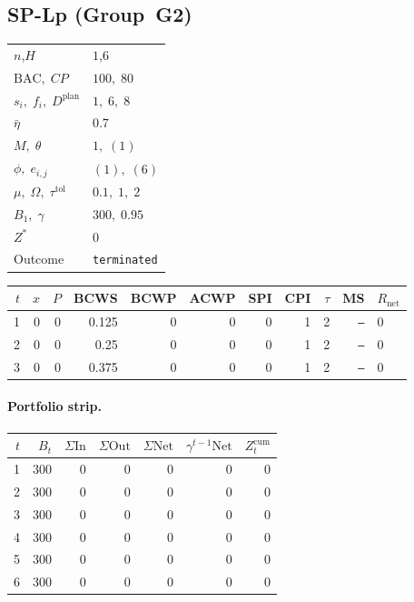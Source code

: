 \documentclass[12pt, a4paper]{article}
\newcommand{\BAC}{\mathrm{BAC}}
\begin{document}
\newpage

\subsection*{SP-Lp  (Group~G2)}
\begin{center}
\begin{tabular}{ll}
\toprule
$n$,\;$H$ & $1$,\;$6$ \\
$\BAC,\;CP$ & $100,\;80$ \\
$s_i,\;f_i,\;D^{\mathrm{plan}}$ & $1,\;6,\;8$ \\
$\bar\eta$ & $0.7$ \\
$M,\;\theta$ & $1,\;(1)$ \\
$\phi,\;e_{i,j}$ & $(1),\;(6)$ \\
$\mu,\;\Omega,\;\tau^{\mathrm{tol}}$ & $0.1,\;1,\;2$ \\
$B_1,\;\gamma$ & $300,\;0.95$ \\
$Z^*$ & $0$ \\
Outcome & \texttt{terminated} \\
\bottomrule
\end{tabular}
\end{center}

\begin{center}
\begin{tabular}{rrrrrrrrrrl}
\toprule
$t$ & $x$ & $P$ & BCWS & BCWP & ACWP & SPI & CPI & $\tau$ & MS & $R_{\mathrm{net}}$\\
\midrule
1 & 0 & 0 & 0.125 & 0 & 0 & 0 & 1 & 2 & \texttt{---} & 0 \\
2 & 0 & 0 & 0.25 & 0 & 0 & 0 & 1 & 2 & \texttt{---} & 0 \\
3 & 0 & 0 & 0.375 & 0 & 0 & 0 & 1 & 2 & \texttt{---} & 0 \\
\bottomrule
\end{tabular}
\end{center}
\paragraph{Portfolio strip.}
\begin{center}
\begin{tabular}{rrrrrrr}
\toprule
$t$ & $B_t$ & $\Sigma\mathrm{In}$ & $\Sigma\mathrm{Out}$ & $\Sigma\mathrm{Net}$ & $\gamma^{t-1}\mathrm{Net}$ & $Z_t^{\mathrm{cum}}$\\
\midrule
1 & 300 & 0 & 0 & 0 & 0 & 0 \\
2 & 300 & 0 & 0 & 0 & 0 & 0 \\
3 & 300 & 0 & 0 & 0 & 0 & 0 \\
4 & 300 & 0 & 0 & 0 & 0 & 0 \\
5 & 300 & 0 & 0 & 0 & 0 & 0 \\
6 & 300 & 0 & 0 & 0 & 0 & 0 \\
\bottomrule
\end{tabular}
\end{center}
\end{document}
